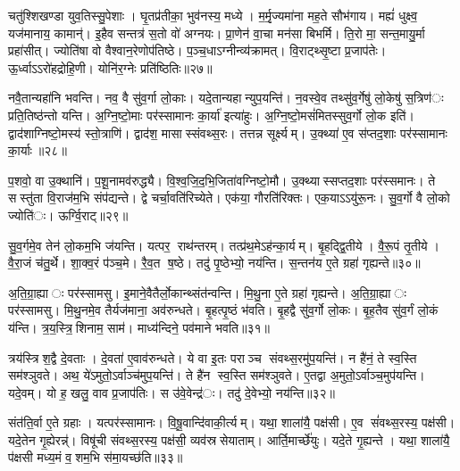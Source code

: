 चतु॑श्शिखण्डा युव॒तिस्सु॒पेशाः। घृ॒तप्र॑तीका॒ भुव॑नस्य॒ मध्ये। म॒र्मृ॒ज्यमा॑ना मह॒ते सौभ॑गाय। मह्यं॑ धुक्ष्व॒ यज॑मानाय॒ कामान्॑। इ॒हैव सन्तत्र॑ स॒तो वो॑ अग्नयः। प्रा॒णेन॑ वा॒चा मन॑सा बिभर्मि। ति॒रो मा॒ सन्त॒मायु॒र्मा प्रहा॑सीत्। ज्योति॑षा वो वैश्वान॒रेणोप॑तिष्ठे। प॒ञ्च॒धाऽग्नीन्व्य॑क्रामत्। वि॒राट्थ्सृ॒ष्टा प्र॒जाप॑तेः। ऊ॒र्ध्वाऽऽरो॑हद्रोहि॒णी। योनि॑र॒ग्नेः प्रति॑ष्ठितिः॥२७॥


नवै॒तान्यहा॑नि भवन्ति। नव॒ वै सु॑व॒र्गा लो॒काः। यदे॒तान्यहान्युप॒यन्ति॑। न॒वस्वे॒व तथ्सु॑व॒र्गेषु॑ लो॒केषु॑ स॒त्रिण॑ः प्रति॒तिष्ठ॑न्तो यन्ति। अ॒ग्नि॒ष्टो॒माः पर॑स्सामानः का॒र्या॑ इत्या॑हुः। अ॒ग्नि॒ष्टो॒मसं॑मितस्सुव॒र्गो लो॒क इति॑। द्वाद॑शाग्निष्टो॒मस्य॑ स्तो॒त्राणि॑। द्वाद॑श॒ मासास्संवथ्स॒रः। तत्तन्न सूर्क्ष्यम्। उ॒क्थ्या॑ ए॒व स॑प्तद॒शाः पर॑स्सामानः का॒र्याः॥२८॥

प॒शवो॒ वा उ॒क्थानि॑। प॒शू॒नामव॑रुद्ध्यै। वि॒श्व॒जि॒द॒भि॒जिता॑वग्निष्टो॒मौ। उ॒क्थ्यास्सप्तद॒शाः पर॑स्समानः। ते सस्तु॑ता वि॒राज॑म॒भि संप॑द्यन्ते। द्वे चर्चा॒वति॑रिच्येते। एक॑या॒ गौरति॑रिक्तः। एक॒याऽऽयु॑रू॒नः। सु॒व॒र्गो वै लो॒को ज्योति॑ः। ऊर्ग्वि॒राट्॥२९॥

सु॒व॒र्गमे॒व तेन॑ लो॒कम॒भि ज॑यन्ति। यत्पर॒ राथ॑न्तरम्। तत्प्र॑थ॒मेऽह॑न्का॒र्यम्। बृ॒हद्द्वि॒तीये। वै॒रू॒पं तृ॒तीये। वै॒रा॒जं च॑तु॒र्थे। शा॒क्व॒रं प॑ञ्च॒मे। रै॒व॒त ष॒ष्ठे। तदु॑ पृ॒ष्ठेभ्यो॒ नय॑न्ति। स॒न्तन॑य ए॒ते ग्रहा॑ गृह्यन्ते॥३०॥

अ॒ति॒ग्रा॒ह्याः पर॑स्सामसु। इ॒माने॒वैतैर्लो॒कान्थ्संत॑न्वन्ति। मि॒थु॒ना ए॒ते ग्रहा॑ गृह्यन्ते। अ॒ति॒ग्रा॒ह्याः पर॑स्सामसु। मि॒थु॒नमे॒व तैर्यज॑माना॒ अव॑रुन्धते। बृ॒हत्पृ॒ष्ठं भ॑वति। बृ॒हद्वै सु॑व॒र्गो लो॒कः। बृ॒ह॒तैव सु॑व॒र्गं लो॒कं य॑न्ति। त्र॒य॒स्त्रि॒शिनाम॒ साम॑। माध्य॑न्दिने॒ पव॑माने भवति॥३१॥

त्रय॑स्त्रिश॒द्वै दे॒वताः। दे॒वता॑ ए॒वाव॑रुन्धते। ये वा इ॒तः पराञ्च संवथ्स॒रमु॑प॒यन्ति॑। न है॑नं॒ ते स्व॒स्ति सम॑श्ञुवते। अथ॒ ये॑ऽमुतो॒ऽर्वाञ्च॑मुप॒यन्ति॑। ते है॑न स्व॒स्ति सम॑श्ञुवते। ए॒तद्वा अ॒मुतो॒ऽर्वाञ्च॒मुप॑यन्ति। यदे॒वम्। यो ह॒ खलु॒ वाव प्र॒जाप॑तिः। स उ॑वे॒वेन्द्र॑ः। तदु॑ दे॒वेभ्यो॒ नय॑न्ति॥३२॥


संत॑ति॒र्वा ए॒ते ग्रहाः। यत्पर॑स्सामानः। वि॒षू॒वान्दि॑वाकी॒र्त्यम्। यथा॒ शाला॑यै॒ पक्ष॑सी। ए॒व सं॑वथ्स॒रस्य॒ पक्ष॑सी। यदे॒तेन गृ॒ह्येरन्न्॑। विषू॑ची संवथ्स॒रस्य॒ पक्ष॑सी॒ व्यव॑स्रसेयाताम्। आर्ति॒मार्च्छे॑युः। यदे॒ते गृ॒ह्यन्ते। यथा॒ शाला॑यै॒ प॑क्षसी मध्य॒मं व॒शम॒भि स॑मा॒यच्छ॑ति॥३३॥

